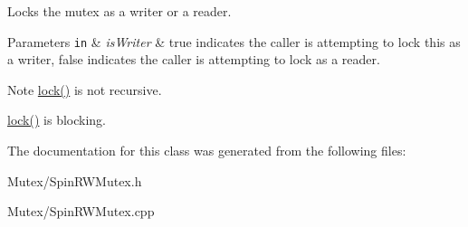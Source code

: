 Locks the mutex as a writer or a reader. 


\begin{DoxyParams}[1]{Parameters}
\mbox{\tt in}  & {\em is\-Writer} & true indicates the caller is attempting to lock this as a writer, false indicates the caller is attempting to lock as a reader. \\
\hline
\end{DoxyParams}
\begin{DoxyNote}{Note}
\hyperlink{class_d_x_1_1_spin_r_w_mutex_a8fe3a96117f0c9594135747f12548add}{lock()} is not recursive. 

\hyperlink{class_d_x_1_1_spin_r_w_mutex_a8fe3a96117f0c9594135747f12548add}{lock()} is blocking. 
\end{DoxyNote}


The documentation for this class was generated from the following files\-:\begin{DoxyCompactItemize}
\item 
Mutex/Spin\-R\-W\-Mutex.\-h\item 
Mutex/Spin\-R\-W\-Mutex.\-cpp\end{DoxyCompactItemize}
